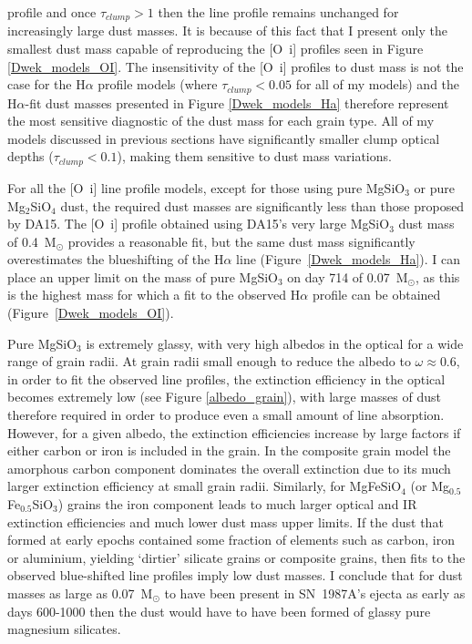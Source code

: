 profile and once $\tau_{clump}>1$ then the line profile remains unchanged 
for increasingly large dust masses.  It is because of this fact that I 
present only the smallest dust mass capable of reproducing the [O~{\sc i}] 
profiles seen in Figure \ref{Dwek_models_OI}.  The insensitivity of the 
[O~{\sc i}] profiles to dust mass is not the case for the H$\alpha$ 
profile models (where $\tau_{clump} < 0.05$ for all of my models) and the 
H$\alpha$-fit dust masses presented in Figure \ref{Dwek_models_Ha} 
therefore represent the most sensitive diagnostic of the dust mass for 
each grain type.  All of my models discussed in previous sections have 
significantly smaller clump optical depths ($\tau_{clump}<0.1$), making 
them sensitive to dust mass variations.

For all the [O~{\sc i}] line profile models, except for those using pure 
MgSiO$_3$ or pure Mg$_2$SiO$_4$ dust, the required dust masses are 
significantly less than those proposed by DA15. The [O~{\sc i}] profile 
obtained using DA15's very large MgSiO$_3$ dust mass of 0.4~M$_{\odot}$ 
provides a reasonable fit, but the same dust mass significantly 
overestimates the blueshifting of the H$\alpha$ line 
(Figure~\ref{Dwek_models_Ha}). I can place an upper limit on the 
mass of pure MgSiO$_3$ on day 714 of 0.07~M$_\odot$, as this 
is the highest mass for which a fit to the observed H$\alpha$ profile can 
be obtained (Figure~\ref{Dwek_models_OI}).

Pure MgSiO$_3$ is extremely glassy, with very high albedos in the optical 
for a wide range of grain radii.  At grain radii small enough to reduce 
the albedo to $\omega \approx 0.6$, in order to fit the observed line 
profiles, the extinction efficiency in the optical becomes extremely low 
(see Figure \ref{albedo_grain}), with large masses of dust therefore 
required in order to produce even a small amount of line absorption. 
However, for a given albedo, the extinction efficiencies increase by large 
factors if either carbon or iron is included in the grain. In the 
composite grain model the amorphous carbon component dominates the overall 
extinction due to its much larger extinction efficiency at small grain 
radii. Similarly, for MgFeSiO$_4$ (or Mg$_{0.5}$Fe$_{0.5}$SiO$_3$) grains
the iron component leads to much larger optical and IR extinction
efficiencies and much lower dust mass upper limits.
If the dust that formed at early epochs contained some fraction of 
elements such as carbon, iron or aluminium, yielding `dirtier' silicate 
grains or composite grains, then fits to the observed blue-shifted line 
profiles imply low dust masses. I conclude that for dust masses as large
as 0.07~M$_\odot$ to have been present in SN~1987A's ejecta as early as 
days 600-1000 then the dust would have to have been formed of glassy pure 
magnesium silicates.

